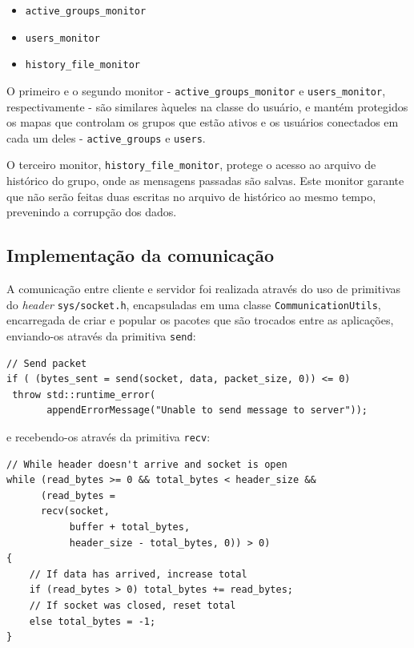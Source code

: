 \documentclass{article}
\begin{document}
\begin{itemize}
    \begin{itemize}
        \item \texttt{active\_groups\_monitor}
        \item \texttt{users\_monitor}
        \item \texttt{history\_file\_monitor}
    \end{itemize}
    \par O primeiro e o segundo monitor - \texttt{active\_groups\_monitor} e \texttt{users\_monitor}, respectivamente - são similares àqueles na classe do usuário, e mantém protegidos os mapas que controlam os grupos que estão ativos e os usuários conectados em cada um deles - \texttt{active\_groups} e \texttt{users}.
    \par O terceiro monitor, \texttt{history\_file\_monitor}, protege o acesso ao arquivo de histórico do grupo, onde as mensagens passadas são salvas. Este monitor garante que não serão feitas duas escritas no arquivo de histórico ao mesmo tempo, prevenindo a corrupção dos dados.
\end{itemize}

\subsection{Implementação da comunicação}
\par A comunicação entre cliente e servidor foi realizada através do uso de primitivas do \textit{header} \texttt{sys/socket.h}, encapsuladas em uma classe \texttt{CommunicationUtils}, encarregada de criar e popular os pacotes que são trocados entre as aplicações, enviando-os através da primitiva \texttt{send}:
\\
\begin{lstlisting}[xleftmargin=-.1\textwidth, xrightmargin=-.1\textwidth]
// Send packet
if ( (bytes_sent = send(socket, data, packet_size, 0)) <= 0)
 throw std::runtime_error(
       appendErrorMessage("Unable to send message to server"));
\end{lstlisting}
e recebendo-os através da primitiva \texttt{recv}:
\begin{lstlisting}
// While header doesn't arrive and socket is open
while (read_bytes >= 0 && total_bytes < header_size && 
      (read_bytes = 
      recv(socket, 
           buffer + total_bytes, 
           header_size - total_bytes, 0)) > 0)
{
    // If data has arrived, increase total
    if (read_bytes > 0) total_bytes += read_bytes;
    // If socket was closed, reset total
    else total_bytes = -1;
}
\end{lstlisting}
\end{document}
